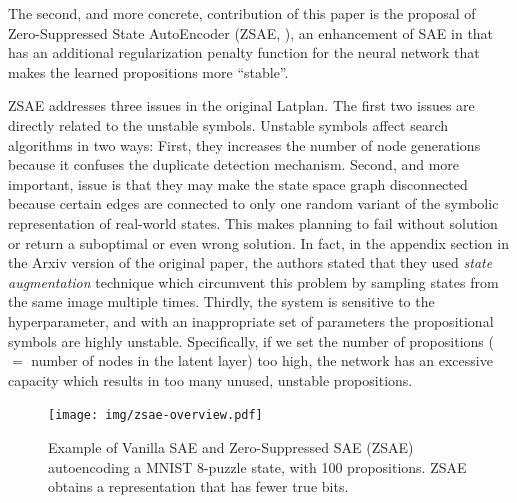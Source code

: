 The second, and more concrete, contribution of this paper is
the proposal of Zero-Suppressed State AutoEncoder (ZSAE, ), an enhancement of SAE in \latentplanner
that has an additional regularization penalty function for the neural network 
that makes the learned propositions more ``stable''.

ZSAE addresses three issues in the original Latplan.
The first two issues are directly related to the unstable symbols.
Unstable symbols affect search algorithms in two ways:
First, they increases the number of node generations because
it confuses the duplicate detection mechanism.
Second, and more important, issue is that they may make the state space graph disconnected because certain edges
are connected to only one random variant of the symbolic representation of real-world states.
This makes planning to fail without solution or return a suboptimal or even wrong solution.
In fact, in the appendix section in the Arxiv version of the original paper,
the authors stated that they used \emph{state augmentation} technique
which circumvent this problem by sampling states from the same image multiple times.
Thirdly, the system is sensitive to the hyperparameter, and with an inappropriate set of parameters
the propositional symbols are highly unstable.
Specifically, if we set the number of propositions ($=$ number of nodes in the latent layer) too high, the network
has an excessive capacity which results in too many unused, unstable propositions.

\begin{figure}[htb]
 \centering
 \texttt{[image: img/zsae-overview.pdf]}
 \caption{
Example of Vanilla SAE and Zero-Suppressed SAE (ZSAE) autoencoding a MNIST 8-puzzle state, with 100 propositions.
ZSAE obtains a representation that has fewer true bits.}
 \label{zsae-overview}
\end{figure}


% 

